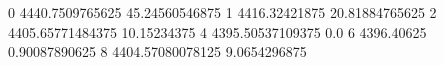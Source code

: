 0 4440.7509765625 45.24560546875
1 4416.32421875 20.81884765625
2 4405.65771484375 10.15234375
4 4395.50537109375 0.0
6 4396.40625 0.90087890625
8 4404.57080078125 9.0654296875
